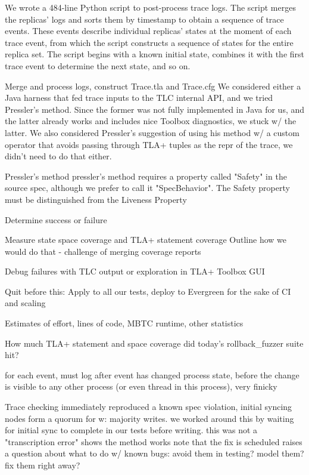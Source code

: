 \documentclass{vldb}
\begin{document}
We wrote a 484-line Python script to post-process trace logs. The script merges the replicas' logs and sorts them by timestamp to obtain a sequence of trace events. These events describe individual replicas' states at the moment of each trace event, from which the script constructs a sequence of states for the entire replica set. The script begins with a known initial state, combines it with the first trace event to determine the next state, and so on.



Merge and process logs, construct Trace.tla and Trace.cfg
We considered either a Java harness that fed trace inputs to the TLC internal API, and we tried Pressler's method. Since the former was not fully implemented in Java for us, and the latter already works and includes nice Toolbox diagnostics, we stuck w/ the latter. We also considered Pressler's suggestion of using his method w/ a custom operator that avoids passing through TLA+ tuples as the repr of the trace, we didn't need to do that either.

Pressler's method
pressler's method requires a property called "Safety" in the source spec, although we prefer to call it "SpecBehavior". The Safety property must be distinguished from the Liveness Property

Determine success or failure

Measure state space coverage and TLA+ statement coverage
Outline how we would do that - challenge of merging coverage reports

Debug failures with TLC output or exploration in TLA+ Toolbox GUI

Quit before this: Apply to all our tests, deploy to Evergreen for the sake of CI and scaling

Estimates of effort, lines of code, MBTC runtime, other statistics

How much TLA+ statement and space coverage did today's rollback_fuzzer suite hit?

for each event, must log after event has changed process state, before the change is visible to any other process (or even thread in this process), very finicky


Trace checking immediately reproduced a known spec violation, initial syncing nodes form a quorum for w: majority writes. we worked around this by waiting for initial sync to complete in our tests before writing. this was not a "transcription error"
shows the method works
note that the fix is scheduled
raises a question about what to do w/ known bugs: avoid them in testing? model them? fix them right away?
\end{document}
